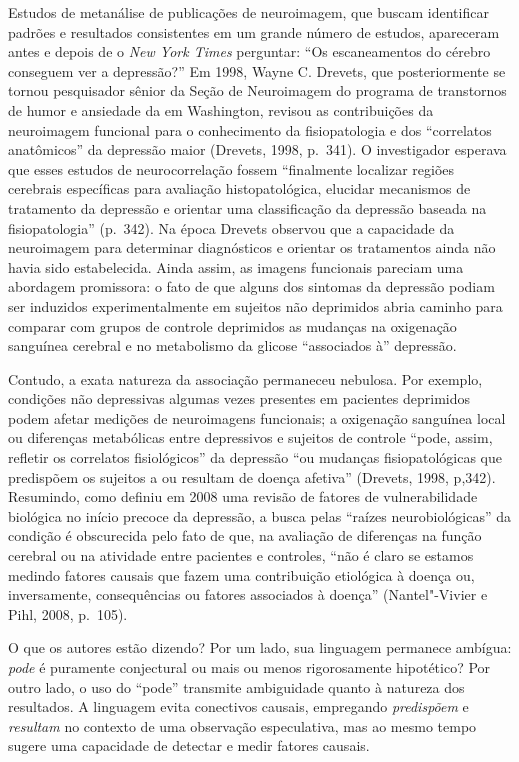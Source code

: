 Estudos de metanálise de publicações de neuroimagem, que buscam
identificar padrões e resultados consistentes em um grande número de
estudos, apareceram antes e depois de o \emph{New York Times} perguntar:
``Os escaneamentos do cérebro conseguem ver a depressão?'' Em 1998,
Wayne C. Drevets, que posteriormente se tornou pesquisador sênior da
Seção de Neuroimagem do programa de transtornos de humor e ansiedade da
 em Washington, revisou as contribuições da neuroimagem funcional
para o conhecimento da fisiopatologia e dos ``correlatos anatômicos'' da
depressão maior (Drevets, 1998, p.~341). O investigador esperava que
esses estudos de neurocorrelação fossem ``finalmente localizar regiões
cerebrais específicas para avaliação histopatológica, elucidar
mecanismos de tratamento da depressão e orientar uma classificação da
depressão baseada na fisiopatologia'' (p.~342). Na época Drevets observou
que a capacidade da neuroimagem para determinar diagnósticos e orientar
os tratamentos ainda não havia sido estabelecida. Ainda assim, as
imagens funcionais pareciam uma abordagem promissora: o fato de que
alguns dos sintomas da depressão podiam ser induzidos experimentalmente
em sujeitos não deprimidos abria caminho para comparar com grupos de
controle deprimidos as mudanças na oxigenação sanguínea cerebral e no
metabolismo da glicose ``associados à'' depressão.

Contudo, a exata natureza da associação permaneceu nebulosa. Por
exemplo, condições não depressivas algumas vezes presentes em pacientes
deprimidos podem afetar medições de neuroimagens funcionais; a
oxigenação sanguínea local ou diferenças metabólicas entre depressivos e
sujeitos de controle ``pode, assim, refletir os correlatos
fisiológicos'' da depressão ``ou mudanças fisiopatológicas que
predispõem os sujeitos a ou resultam de doença afetiva'' (Drevets, 1998,
p,342). Resumindo, como definiu em 2008 uma revisão de fatores de
vulnerabilidade biológica no início precoce da depressão, a busca pelas
``raízes neurobiológicas'' da condição é obscurecida pelo fato de que,
na avaliação de diferenças na função cerebral ou na atividade entre
pacientes e controles, ``não é claro se estamos medindo fatores causais
que fazem uma contribuição etiológica à doença ou, inversamente,
consequências ou fatores associados à doença'' (Nantel"-Vivier e Pihl,
2008, p.~105).

O que os autores estão dizendo? Por um lado, sua linguagem permanece
ambígua: \emph{pode} é puramente conjectural ou mais ou menos
rigorosamente hipotético? Por outro lado, o uso do ``pode'' transmite
ambiguidade quanto à natureza dos resultados. A linguagem evita
conectivos causais, empregando \emph{predispõem} e \emph{resultam} no
contexto de uma observação especulativa, mas ao mesmo tempo sugere uma
capacidade de detectar e medir fatores causais.

